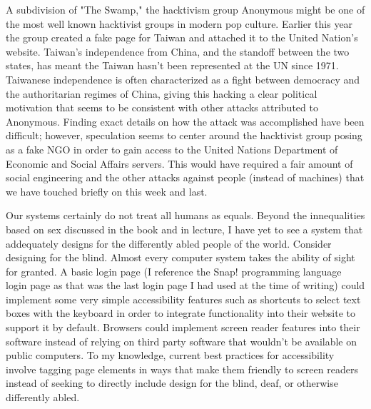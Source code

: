 




A subdivision of "The Swamp," the hacktivism group Anonymous might be one of the most well known hacktivist groups in modern pop culture. Earlier this year the group created a fake page for Taiwan and attached it to the United Nation's website. Taiwan's independence from China, and the standoff between the two states, has meant the Taiwan hasn't been represented at the UN since 1971. Taiwanese independence is often characterized as a fight between democracy and the authoritarian regimes of China, giving this hacking a clear political motivation that seems to be consistent with other attacks attributed to Anonymous. Finding exact details on how the attack was accomplished have been difficult; however, speculation seems to center around the hacktivist group posing as a fake NGO in order to gain access to the United Nations Department of Economic and Social Affairs servers. This would have required a fair amount of social engineering and the other attacks against people (instead of machines) that we have touched briefly on this week and last. \\


Our systems certainly do not treat all humans as equals. Beyond the innequalities based on sex discussed in the book and in lecture, I have yet to see a system that addequately designs for the differently abled people of the world. Consider designing for the blind. Almost every computer system takes the ability of sight for granted. A basic login page (I reference the Snap! programming language login page as that was the last login page I had used at the time of writing) could implement some very simple accessibility features such as shortcuts to select text boxes with the keyboard in order to integrate functionality into their website to support it by default. Browsers could implement screen reader features into their software instead of relying on third party software that wouldn't be available on public computers. To my knowledge, current best practices for accessibility involve tagging page elements in ways that make them friendly to screen readers instead of seeking to directly include design for the blind, deaf, or otherwise differently abled. \\


